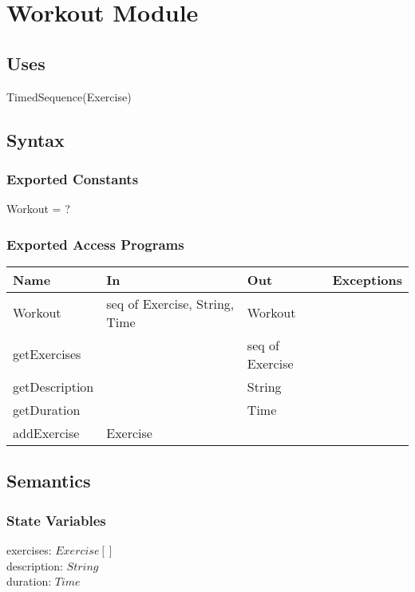 \documentclass[12pt, titlepage]{article}
\begin{document}
\newpage

\section{Workout Module}

\subsection{Uses}
TimedSequence(Exercise)
\subsection{Syntax}

\subsubsection{Exported Constants}
Workout = ?
\subsubsection{Exported Access Programs}

\begin{center}
	\begin{tabular}{p{2cm} p{4cm} p{4cm} p{2cm}}
		\hline
		\textbf{Name} & \textbf{In} & \textbf{Out} & \textbf{Exceptions} \\
		\hline
		Workout & seq of Exercise, String, Time & Workout &  \\
		getExercises &  & seq of Exercise &  \\
		getDescription &  & String &  \\
		getDuration &  & Time &  \\
		addExercise & Exercise & &  \\
		\hline
	\end{tabular}
\end{center}

\subsection{Semantics}

\subsubsection{State Variables}
exercises: $Exercise[]$ \\
description: $String$ \\
duration: $Time$ \\
\end{document}
